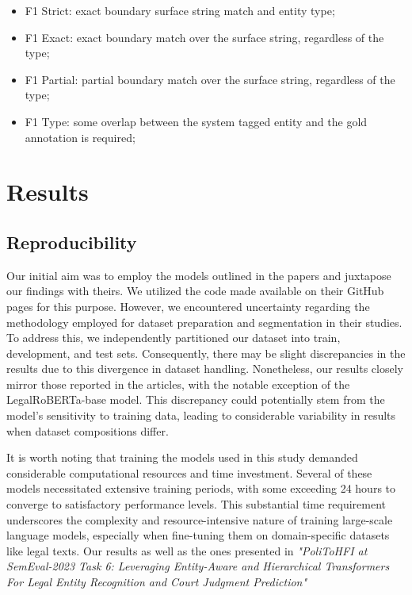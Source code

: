 \documentclass{article}
\begin{document}
\begin{itemize}
    \item F1 Strict: exact boundary surface string match and entity type;
    \item F1 Exact: exact boundary match over the surface string, regardless of the type;
    \item F1 Partial: partial boundary match over the surface string, regardless of the type;
    \item F1 Type: some overlap between the system tagged entity and the gold annotation is required;
\end{itemize}




 
\section{Results}

\subsection{Reproducibility}

Our initial aim was to employ the models outlined in the papers and juxtapose our findings with theirs. We utilized the code made available on their GitHub pages for this purpose. However, we encountered uncertainty regarding the methodology employed for dataset preparation and segmentation in their studies. To address this, we independently partitioned our dataset into train, development, and test sets. Consequently, there may be slight discrepancies in the results due to this divergence in dataset handling. Nonetheless, our results closely mirror those reported in the articles, with the notable exception of the LegalRoBERTa-base model. This discrepancy could potentially stem from the model's sensitivity to training data, leading to considerable variability in results when dataset compositions differ.

It is worth noting that training the models used in this study demanded considerable computational resources and time investment. Several of these models necessitated extensive training periods, with some exceeding 24 hours to converge to satisfactory performance levels. This substantial time requirement underscores the complexity and resource-intensive nature of training large-scale language models, especially when fine-tuning them on domain-specific datasets like legal texts. Our results as well as the ones presented in \textit{"{P}oli{T}o{HFI} at {S}em{E}val-2023 Task 6: Leveraging Entity-Aware and Hierarchical Transformers For Legal Entity Recognition and Court Judgment Prediction"} \cite{article2}
\end{document}
